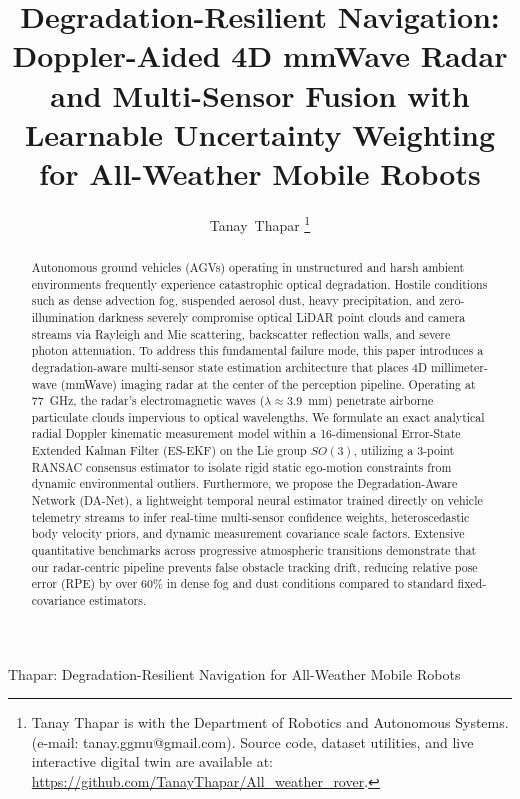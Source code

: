 \documentclass[lettersize,journal]{IEEEtran}
\begin{document}
\title{Degradation-Resilient Navigation: Doppler-Aided 4D mmWave Radar and Multi-Sensor Fusion with Learnable Uncertainty Weighting for All-Weather Mobile Robots}

\author{Tanay~Thapar%
\thanks{Tanay Thapar is with the Department of Robotics and Autonomous Systems. (e-mail: tanay.ggmu@gmail.com). Source code, dataset utilities, and live interactive digital twin are available at: \url{https://github.com/TanayThapar/All_weather_rover}.}}

%
{Thapar: Degradation-Resilient Navigation for All-Weather Mobile Robots}

\maketitle

\begin{abstract}
Autonomous ground vehicles (AGVs) operating in unstructured and harsh ambient environments frequently experience catastrophic optical degradation. Hostile conditions such as dense advection fog, suspended aerosol dust, heavy precipitation, and zero-illumination darkness severely compromise optical LiDAR point clouds and camera streams via Rayleigh and Mie scattering, backscatter reflection walls, and severe photon attenuation. 
To address this fundamental failure mode, this paper introduces a degradation-aware multi-sensor state estimation architecture that places 4D millimeter-wave (mmWave) imaging radar at the center of the perception pipeline. 
Operating at 77~GHz, the radar's electromagnetic waves ($\lambda \approx 3.9$~mm) penetrate airborne particulate clouds impervious to optical wavelengths. 
We formulate an exact analytical radial Doppler kinematic measurement model within a 16-dimensional Error-State Extended Kalman Filter (ES-EKF) on the Lie group $SO(3)$, utilizing a 3-point RANSAC consensus estimator to isolate rigid static ego-motion constraints from dynamic environmental outliers. 
Furthermore, we propose the Degradation-Aware Network (DA-Net), a lightweight temporal neural estimator trained directly on vehicle telemetry streams to infer real-time multi-sensor confidence weights, heteroscedastic body velocity priors, and dynamic measurement covariance scale factors. 
Extensive quantitative benchmarks across progressive atmospheric transitions demonstrate that our radar-centric pipeline prevents false obstacle tracking drift, reducing relative pose error (RPE) by over 60\% in dense fog and dust conditions compared to standard fixed-covariance estimators.
\end{abstract}
\end{document}
